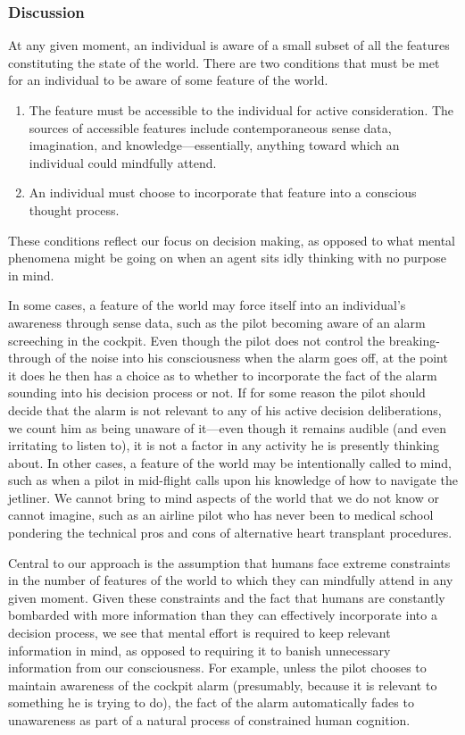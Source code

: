 \documentclass[
11pt,
titlepage,
reqno,
]{article}%
\theoremstyle{definition}
\begin{document}
\subsubsection{Discussion}
At any given moment, an individual is aware of a small subset of all the features constituting the state of the world.
There are two conditions that must be met for an individual to be aware of some feature of the world. 
\begin{enumerate}
	\item The feature must be accessible to the individual for active consideration. The sources of accessible features include contemporaneous sense data, imagination, and knowledge---essentially, anything toward which an individual could mindfully attend.
	\item An individual must choose to incorporate that feature into a conscious thought process.
\end{enumerate}
These conditions reflect our focus on decision making, as opposed to what mental phenomena might be going on when an agent sits idly thinking with no purpose in mind.
 
In some cases, a feature of the world may force itself into an individual's awareness through sense data, such as the pilot becoming aware of an alarm screeching in the cockpit.
Even though the pilot does not control the breaking-through of the noise into his consciousness when the alarm goes off, at the point it does he then has a choice as to whether to incorporate the fact of the alarm sounding into his decision process or not.
If for some reason the pilot should decide that the alarm is not relevant to any of his active decision deliberations, we count him as being unaware of it---even though it remains audible (and even irritating to listen to), it is not a factor in any activity he is presently thinking about.
In other cases, a feature of the world may be intentionally called to mind, such as when a pilot in mid-flight calls upon his knowledge of how to navigate the jetliner. 
We cannot bring to mind aspects of the world that we do not know or cannot imagine, such as an airline pilot who has never been to medical school pondering the technical pros and cons of alternative heart transplant procedures. 

Central to our approach is the assumption that humans face extreme constraints in the number of features of the world to which they can mindfully attend in any given moment.
Given these constraints and the fact that humans are constantly bombarded with more information than they can effectively incorporate into a decision process, we see that mental effort is required to keep relevant information in mind, as opposed to requiring it to banish unnecessary information from our consciousness.
For example, unless the pilot chooses to maintain awareness of the cockpit alarm (presumably, because it is relevant to something he is trying to do), the fact of the alarm automatically fades to unawareness as part of a natural process of constrained human cognition. 
\end{document}
